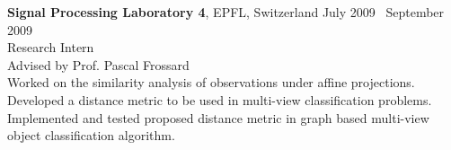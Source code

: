 
    \textbf{Signal Processing Laboratory 4}, EPFL, Switzerland \hfill July 2009 \textendash ~September 2009\vspace{0mm}\\\vspace{0mm}
	\hspace{-1mm}Research Intern  \hfill \vspace{0mm}\\\vspace{0mm}
	\hspace{-1mm}Advised by Prof. Pascal Frossard \hfill \vspace{2mm}\\\vspace{0mm}
	\hspace{-1mm}Worked on the similarity analysis of observations under affine projections. Developed a distance metric to be used in multi-view classification problems. Implemented and tested proposed distance metric in graph based multi-view object classification algorithm.

\iffalse
    \hspace{-0.5mm}\textbf{Vestel Electronics R\&D Corporation}, Ankara, Turkey \hfill July 2008 \textendash ~September 2008\vspace{0mm}\\\vspace{0mm}
	\hspace{-1mm}Summer Intern  \hfill \vspace{0mm}\\\vspace{0mm}
	\hspace{-1mm}Worked on the frame rate conversion project. Implemented a computationally efficient true motion estimation system by combining block-based and optical-flow based techniques.
	\fi
